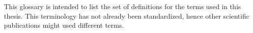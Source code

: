 This glossary is intended to list the set of definitions for the terms used in this thesis.
This terminology has not already been standardized, hence other scientific publications might used different terms.